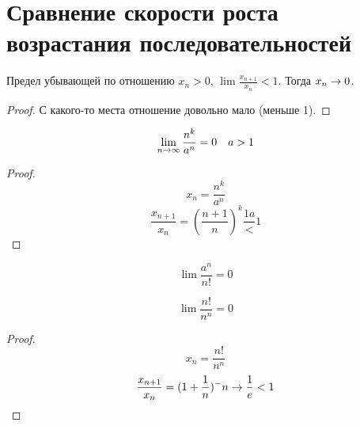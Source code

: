 ﻿\section{Сравнение скорости роста возрастания последовательностей}

\begin{theorem}{Предел убывающей по отношению}
$x_n > 0$, $\lim \frac{x_{n+1}}{x_n} < 1$. Тогда $x_n \rightarrow 0$.
\end{theorem}
\begin{proof}
С какого-то места отношение довольно мало (меньше 1).
\end{proof}
\begin{conseq}
$$\lim_{n\rightarrow\infty} \frac{n^k}{a^n} = 0\quad a>1$$
\end{conseq}
\begin{proof}
$$x_n = \frac{n^k}{a^n}$$
$$\frac{x_{n+1}}{x_n} = \left(\frac{n+1}n\right)^k \frac{1a} < 1$$
\end{proof}
\begin{conseq}
$$\lim \frac{a^n}{n!} = 0$$
\end{conseq}

\begin{conseq}
$$\lim \frac{n!}{n^n} = 0$$
\end{conseq}
\begin{proof}
$$x_n = \frac{n!}{n^n}$$
$$\frac{x_{n+1}}{x_n} = (1+\frac1n)^-n \rightarrow \frac1e < 1$$
\end{proof}


